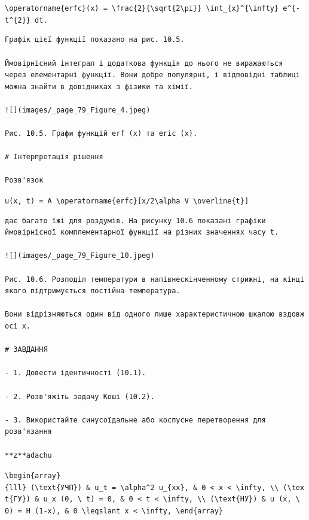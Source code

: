 \documentclass[
  ukrainian,
]{article}
\begin{document}
\texttt{\textbackslash{}operatorname\{erfc\}(x)\ =\ \textbackslash{}frac\{2\}\{\textbackslash{}sqrt\{2\textbackslash{}pi\}\}\ \textbackslash{}int\_\{x\}\^{}\{\textbackslash{}infty\}\ e\^{}\{-t\^{}\{2\}\}\ dt.}

\begin{verbatim}
Графік цієї функції показано на рис. 10.5.

Ймовірнісний інтеграл і додаткова функція до нього не виражаються через елементарні функції. Вони добре популярні, і відповідні таблиці можна знайти в довідниках з фізики та хімії.

![](images/_page_79_Figure_4.jpeg)

Рис. 10.5. Графи функцій erf (x) та eric (x).

# Інтерпретація рішення

Розв'язок
\end{verbatim}

\texttt{u(x,\ t)\ =\ A\ \textbackslash{}operatorname\{erfc\}{[}x/2\textbackslash{}alpha\ V\ \textbackslash{}overline\{t\}{]}}

\begin{verbatim}
дає багато їжі для роздумів. На рисунку 10.6 показані графіки ймовірнісної комплементарної функції на різних значеннях часу t.

![](images/_page_79_Figure_10.jpeg)

Рис. 10.6. Розподіл температури в напівнескінченному стрижні, на кінці якого підтримується постійна температура.

Вони відрізняються один від одного лише характеристичною шкалою вздовж осі x.

# ЗАВДАННЯ

- 1. Довести ідентичності (10.1).

- 2. Розв'яжіть задачу Коші (10.2).

- 3. Використайте синусоїдальне або коспусне перетворення для розв'язання

**z**adachu
\end{verbatim}

\texttt{\textbackslash{}begin\{array\}\{lll\}\ (\textbackslash{}text\{УЧП\})\ \&\ u\_t\ =\ \textbackslash{}alpha\^{}2\ u\_\{xx\},\ \&\ 0\ \textless{}\ x\ \textless{}\ \textbackslash{}infty,\ \textbackslash{}\textbackslash{}\ (\textbackslash{}text\{ГУ\})\ \&\ u\_x\ (0,\ \textbackslash{}\ t)\ =\ 0,\ \&\ 0\ \textless{}\ t\ \textless{}\ \textbackslash{}infty,\ \textbackslash{}\textbackslash{}\ (\textbackslash{}text\{НУ\})\ \&\ u\ (x,\ \textbackslash{}\ 0)\ =\ H\ (1-x),\ \&\ 0\ \textbackslash{}leqslant\ x\ \textless{}\ \textbackslash{}infty,\ \textbackslash{}end\{array\}}
\end{document}
